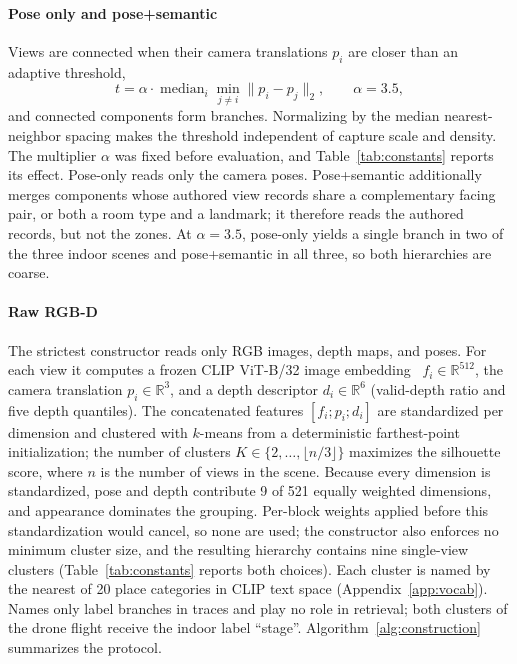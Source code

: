 \documentclass{ieeeaccess}
\begin{document}
\paragraph{Pose only and pose+semantic}
Views are connected when their camera translations $p_i$ are closer than an
adaptive threshold,
\begin{equation}
 t=\alpha\cdot\operatorname{median}_i\min_{j\neq i}\lVert p_i-p_j\rVert_2,
 \qquad \alpha=3.5,
 \label{eq:threshold}
\end{equation}
and connected components form branches. Normalizing by the median
nearest-neighbor spacing makes the threshold independent of capture scale and
density. The multiplier $\alpha$ was fixed before evaluation, and
Table~\ref{tab:constants} reports its effect. Pose-only reads only the camera
poses. Pose+semantic additionally merges components whose authored view records
share a complementary facing pair, or both a room type and a landmark; it
therefore reads the authored records, but not the zones. At $\alpha=3.5$,
pose-only yields a single branch in two of the three indoor scenes and
pose+semantic in all three, so both hierarchies are coarse.

\paragraph{Raw RGB-D}
The strictest constructor reads only RGB images, depth maps, and poses. For each
view it computes a frozen CLIP ViT-B/32 image embedding~\cite{radford2021clip}
$f_i\in\mathbb{R}^{512}$, the camera translation $p_i\in\mathbb{R}^3$, and a
depth descriptor $d_i\in\mathbb{R}^6$ (valid-depth ratio and five depth
quantiles). The concatenated features $[f_i;p_i;d_i]$ are standardized per
dimension and clustered with $k$-means from a deterministic farthest-point
initialization; the number of clusters $K\in\{2,\ldots,\lfloor n/3\rfloor\}$
maximizes the silhouette score, where $n$ is the number of views in the scene.
Because every dimension is standardized, pose and depth contribute 9 of 521
equally weighted dimensions, and appearance dominates the grouping. Per-block weights applied before this standardization would cancel, so none
are used; the constructor also enforces no minimum cluster size, and the
resulting hierarchy contains nine single-view clusters (Table~\ref{tab:constants}
reports both choices). Each cluster is named by the nearest of 20
place categories in CLIP text space (Appendix~\ref{app:vocab}). Names only label
branches in traces and play no role in retrieval; both clusters of the drone
flight receive the indoor label ``stage''. Algorithm~\ref{alg:construction}
summarizes the protocol.
\end{document}

